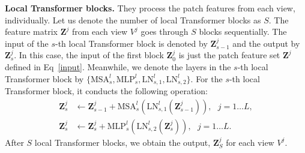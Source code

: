 \documentclass{bmvc2k}
\begin{document}
\vspace{0.1in}

\noindent \textbf{Local Transformer blocks.} They process the patch features from each view, individually.
Let us denote the number of local Transformer blocks as $S$. The feature matrix $\mathbf{Z}^j$ from each view $V^j$ goes through $S$ blocks sequentially.
The input of the $s$-th local Transformer block is denoted by $\mathbf{Z}^j_{s-1}$  and the output by $\mathbf{Z}^j_{s}$. In this case, the input of the first block $\mathbf{Z}_0^j$ is just the patch feature set $\mathbf{Z}^j$ defined in Eq~\eqref{input}. 
Meanwhile, we denote the layers in the $s$-th local Transformer block by $\{\mathrm{MSA}_s^l,\mathrm{MLP}_s^l, \mathrm{LN}_{s,1}^l,\mathrm{LN}_{s,2}^l\}$. For the $s$-th local Transformer block, it conducts the following operation:
\begin{equation}
    \begin{split}
     \mathbf{Z}_s^j    &\gets  \mathbf{Z}^j_{s-1} + \mathrm{MSA}_s^l(\mathrm{LN}_{s,1}^l(\mathbf{Z}^j_{s-1})),~~~ j = 1 \dots L,\\\mathbf{Z}_s^j   &\gets  \mathbf{Z}^j_s + \mathrm{MLP}_{s}^l(\mathrm{LN}_{s,2}^l(\mathbf{Z}_s^j)),~~~ j = 1 \dots L.
    \end{split}
\end{equation}
After $S$ local Transformer blocks, we obtain the output, $ \mathbf{Z}^j_S$ for each view $V^j$. 

\vspace{0.1in}
\end{document}
